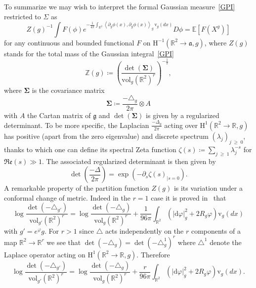 \documentclass[AHL,Unicode,longabstracts,published]{cedram}
\renewcommand{\geq}{\;\geqslant\;}
\newcommand{\dd}{\mathrm{d}}
\newcommand{\frkg}{\mathfrak{g}}
\newcommand{\frka}{\mathfrak{a}}
\newcommand{\frkRe}{\mathfrak{Re}}
\newcommand{\vol}{\mathrm{vol}}
\newcommand{\rmv}{\mathrm{v}}
\newcommand{\rmH}{\mathrm{H}}
\newcommand{\R}{\mathbb{R}}
\newcommand{\Z}{\mathbb{Z}}
\newcommand{\E}{\mathbb{E}}
\newcommand{\norm}[1]{\left\lvert#1\right\rvert}
\begin{document}
To summarize we may wish to interpret the formal Gaussian measure~\eqref{GPI} restricted to $\Sigma$ as
\begin{equation*}\label{def:GPIr}
Z(g)^{-1}\int F(\phi)e^{-\frac{1}{4\pi}\int_{\R^2} \left\langle\partial_{g} \phi(x), \partial_{g} \phi(x) \right\rangle_{g}\,\rmv_{g}(dx) }D\phi=\E\left[F\left(X^g\right)\right]
\end{equation*}
for any continuous and bounded functional $F$ on $\rmH^{-1}(\R^2\to \frka,g)$, where $Z(g)$ stands for the total mass of the Gaussian integral~\eqref{GPI}
\begin{equation*}
\Z(g)\coloneqq \left(\frac{\det (\bm\Sigma)}{\vol_g(\R^2)^r}\right)^{-\frac12},
\end{equation*}
where $ \bm\Sigma$ is the covariance matrix
\begin{equation}
\bm\Sigma\coloneqq\frac{-\triangle_{g}}{2\pi}\otimes A
\end{equation}
with $A$ the Cartan matrix of $\frkg$ and $ \det (\bm\Sigma)$ is given by a regularized determinant. To be more specific, the Laplacian $\frac{-\Delta_g}{2\pi}$ acting over $\rmH^{1}(\R^2\to\R,g)$ has positive (apart from the zero eigenvalue) and discrete spectrum $(\lambda_j)_{j\geq 0}$, thanks to which one can define its spectral Zeta function $\zeta(s)\coloneqq \sum_{j\geq 1}\lambda_j^{-s}$ for $\frkRe(s)\gg1$. The associated regularized determinant is then given by
\[
\det\left(\frac{-\Delta}{2\pi}\right)=\exp\left(-\partial_{s}\zeta(s)_{\vert s=0}\right).
\]
A remarkable property of the partition function $Z(g)$ is its variation under a conformal change of metric. Indeed in the $r=1$ case it is proved in~\cite[Equation (1.13)]{OPS88} that
\begin{equation*}
\log \frac{\det\left(-\triangle_{g'}\right)}{\vol_{g'}(\R^2)^r}=\log \frac{\det\left(-\triangle_{g}\right)}{\vol_g\left(\R^2\right)^r}+\frac{1}{96\pi}\int_{\R^2}\left(\norm{\dd \varphi}^2_g+2R_g\varphi\right)\rmv_{g}(dx)
\end{equation*}
with $g'=e^{\varphi}g$. For $r>1$ since $\triangle$ acts independently on the $r$ components of a map $\R^2\to\R^r$ we see that $\det(-\triangle_{g})=\det(-\triangle^1_{g})^r$ where $\triangle^1$ denote the Laplace operator acting on $\rmH^{1}(\R^2\to\R,g)$. Therefore
\begin{equation}
\log \frac{\det\left(-\triangle_{g'}\right)}{\vol_{g'}\left(\R^2\right)^r}=\log \frac{\det\left(-\triangle_{g}\right)}{\vol_g\left(\R^2\right)^r}+\frac{r}{96\pi}\int_{\R^2}\left(\norm{\dd \varphi}^2_g+2R_g\varphi\right)\rmv_{g}(dx).
\end{equation}
\end{document}
